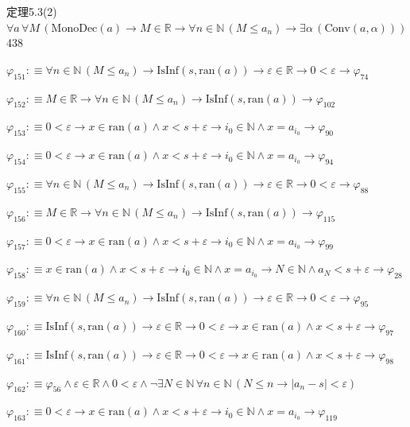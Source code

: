 \begin{fullproof}{定理5.3(2)}{$\forall a\,\forall M\,(\mathrm{MonoDec}(a) \to M \in \mathbb{R} \to \forall n \in \mathbb{N}\,(M \leq a_{n}) \to \exists \alpha\,(\mathrm{Conv}(a,\alpha)))$}{438}
\begin{abbrevlist}
\item $\varphi_{151} :\equiv \forall n \in \mathbb{N}\,(M \leq a_{n}) \to \mathrm{IsInf}(s,\mathrm{ran}(a)) \to \varepsilon \in \mathbb{R} \to 0 < \varepsilon \to \varphi_{74}$
\item $\varphi_{152} :\equiv M \in \mathbb{R} \to \forall n \in \mathbb{N}\,(M \leq a_{n}) \to \mathrm{IsInf}(s,\mathrm{ran}(a)) \to \varphi_{102}$
\item $\varphi_{153} :\equiv 0 < \varepsilon \to x \in \mathrm{ran}(a) \land x < s + \varepsilon \to i_{0} \in \mathbb{N} \land x = a_{i_{0}} \to \varphi_{90}$
\item $\varphi_{154} :\equiv 0 < \varepsilon \to x \in \mathrm{ran}(a) \land x < s + \varepsilon \to i_{0} \in \mathbb{N} \land x = a_{i_{0}} \to \varphi_{94}$
\item $\varphi_{155} :\equiv \forall n \in \mathbb{N}\,(M \leq a_{n}) \to \mathrm{IsInf}(s,\mathrm{ran}(a)) \to \varepsilon \in \mathbb{R} \to 0 < \varepsilon \to \varphi_{88}$
\item $\varphi_{156} :\equiv M \in \mathbb{R} \to \forall n \in \mathbb{N}\,(M \leq a_{n}) \to \mathrm{IsInf}(s,\mathrm{ran}(a)) \to \varphi_{115}$
\item $\varphi_{157} :\equiv 0 < \varepsilon \to x \in \mathrm{ran}(a) \land x < s + \varepsilon \to i_{0} \in \mathbb{N} \land x = a_{i_{0}} \to \varphi_{99}$
\item $\varphi_{158} :\equiv x \in \mathrm{ran}(a) \land x < s + \varepsilon \to i_{0} \in \mathbb{N} \land x = a_{i_{0}} \to N \in \mathbb{N} \land a_{N} < s + \varepsilon \to \varphi_{28}$
\item $\varphi_{159} :\equiv \forall n \in \mathbb{N}\,(M \leq a_{n}) \to \mathrm{IsInf}(s,\mathrm{ran}(a)) \to \varepsilon \in \mathbb{R} \to 0 < \varepsilon \to \varphi_{95}$
\item $\varphi_{160} :\equiv \mathrm{IsInf}(s,\mathrm{ran}(a)) \to \varepsilon \in \mathbb{R} \to 0 < \varepsilon \to x \in \mathrm{ran}(a) \land x < s + \varepsilon \to \varphi_{97}$
\item $\varphi_{161} :\equiv \mathrm{IsInf}(s,\mathrm{ran}(a)) \to \varepsilon \in \mathbb{R} \to 0 < \varepsilon \to x \in \mathrm{ran}(a) \land x < s + \varepsilon \to \varphi_{98}$
\item $\varphi_{162} :\equiv \varphi_{56} \land \varepsilon \in \mathbb{R} \land 0 < \varepsilon \land \neg \exists N \in \mathbb{N}\,\forall n \in \mathbb{N}\,(N \leq n \to \lvert a_{n} - s \rvert < \varepsilon)$
\item $\varphi_{163} :\equiv 0 < \varepsilon \to x \in \mathrm{ran}(a) \land x < s + \varepsilon \to i_{0} \in \mathbb{N} \land x = a_{i_{0}} \to \varphi_{119}$

\end{abbrevlist}
\end{fullproof}
